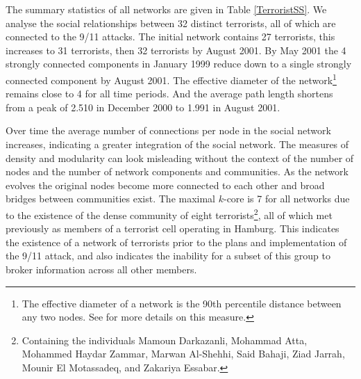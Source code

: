 The summary statistics of all networks are given in Table \ref{TerroristSS}. We analyse the social relationships between 32 distinct terrorists, all of which are connected to the 9/11 attacks. The initial network contains 27 terrorists, this increases to 31 terrorists, then 32 terrorists by August 2001. By May 2001 the 4 strongly connected components in January 1999 reduce down to a single strongly connected component by August 2001. The effective diameter of the network\footnote{The effective diameter of a network is the 90th percentile distance between any two nodes. See \citet{Leskovec2005a} for more details on this measure.} remains close to 4 for all time periods. And the average path length shortens from a peak of 2.510 in December 2000 to 1.991 in August 2001.

Over time the average number of connections per node in the social network increases, indicating a greater integration of the social network. The measures of density and modularity can look misleading without the context of the number of nodes and the number of network components and communities. As the network evolves the original nodes become more connected to each other and broad bridges between communities exist. The maximal $k$-core is 7 for all networks due to the existence of the dense community of eight terrorists\footnote{Containing the individuals Mamoun Darkazanli, Mohammad Atta, Mohammed Haydar Zammar, Marwan Al-Shehhi, Said Bahaji, Ziad Jarrah, Mounir El Motassadeq, and Zakariya Essabar.}, all of which met previously as members of a terrorist cell operating in Hamburg. This indicates the existence of a network of terrorists prior to the plans and implementation of the 9/11 attack, and also indicates the inability for a subset of this group to broker information across all other members.

